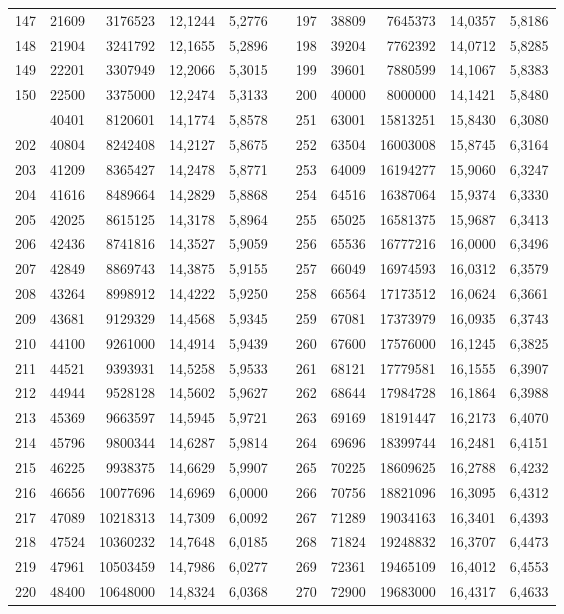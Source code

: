 \begin{longtable}{rrrrrrrrrrr}
147&21609&3176523&12,1244&5,2776&&197&38809&7645373&14,0357&5,8186\\
148&21904&3241792&12,1655&5,2896&&198&39204&7762392&14,0712&5,8285\\
149&22201&3307949&12,2066&5,3015&&199&39601&7880599&14,1067&5,8383\\
150&22500&3375000&12,2474&5,3133&&200&40000&8000000&14,1421&5,8480\\
\newpage
201&40401&8120601&14,1774&5,8578&&251&63001&15813251&15,8430&6,3080\\
202&40804&8242408&14,2127&5,8675&&252&63504&16003008&15,8745&6,3164\\
203&41209&8365427&14,2478&5,8771&&253&64009&16194277&15,9060&6,3247\\
204&41616&8489664&14,2829&5,8868&&254&64516&16387064&15,9374&6,3330\\
205&42025&8615125&14,3178&5,8964&&255&65025&16581375&15,9687&6,3413\\
206&42436&8741816&14,3527&5,9059&&256&65536&16777216&16,0000&6,3496\\
207&42849&8869743&14,3875&5,9155&&257&66049&16974593&16,0312&6,3579\\
208&43264&8998912&14,4222&5,9250&&258&66564&17173512&16,0624&6,3661\\
209&43681&9129329&14,4568&5,9345&&259&67081&17373979&16,0935&6,3743\\
210&44100&9261000&14,4914&5,9439&&260&67600&17576000&16,1245&6,3825\\
211&44521&9393931&14,5258&5,9533&&261&68121&17779581&16,1555&6,3907\\
212&44944&9528128&14,5602&5,9627&&262&68644&17984728&16,1864&6,3988\\
213&45369&9663597&14,5945&5,9721&&263&69169&18191447&16,2173&6,4070\\
214&45796&9800344&14,6287&5,9814&&264&69696&18399744&16,2481&6,4151\\
215&46225&9938375&14,6629&5,9907&&265&70225&18609625&16,2788&6,4232\\
216&46656&10077696&14,6969&6,0000&&266&70756&18821096&16,3095&6,4312\\
217&47089&10218313&14,7309&6,0092&&267&71289&19034163&16,3401&6,4393\\
218&47524&10360232&14,7648&6,0185&&268&71824&19248832&16,3707&6,4473\\
219&47961&10503459&14,7986&6,0277&&269&72361&19465109&16,4012&6,4553\\
220&48400&10648000&14,8324&6,0368&&270&72900&19683000&16,4317&6,4633\\

\end{longtable}
